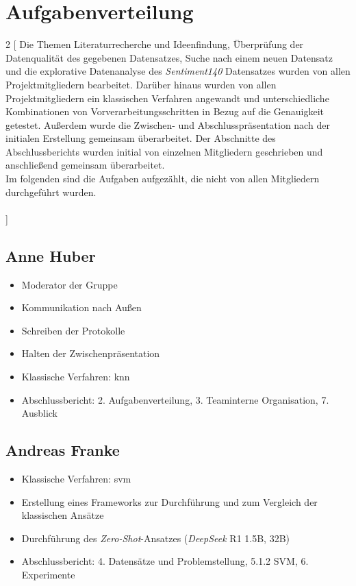 \section{Aufgabenverteilung}\label{sec:aufgabenverteilung}

\begin{multicols}{2}
[
Die Themen Literaturrecherche und Ideenfindung, Überprüfung der Datenqualität des gegebenen Datensatzes, Suche nach einem neuen Datensatz und die explorative Datenanalyse des \textit{Sentiment140} Datensatzes wurden von allen Projektmitgliedern bearbeitet.
Darüber hinaus wurden von allen Projektmitgliedern ein klassischen Verfahren angewandt und unterschiedliche Kombinationen von Vorverarbeitungsschritten in Bezug auf die Genauigkeit getestet.
Außerdem wurde die Zwischen- und Abschlusspräsentation nach der initialen Erstellung gemeinsam überarbeitet.
Der Abschnitte des Abschlussberichts wurden initial von einzelnen Mitgliedern geschrieben und anschließend gemeinsam überarbeitet.\\
Im folgenden sind die Aufgaben aufgezählt, die nicht von allen Mitgliedern durchgeführt wurden.\\
\\
]

\subsection{Anne Huber}
\begin{itemize}
    \item Moderator der Gruppe
    \item Kommunikation nach Außen
    \item Schreiben der Protokolle
    \item Halten der Zwischenpräsentation
    \item Klassische Verfahren: \gls{knn}
    \item Abschlussbericht: 2. Aufgabenverteilung, 3. Teaminterne Organisation, 7. Ausblick
\end{itemize}


\subsection{Andreas Franke}
\begin{itemize}
    \item Klassische Verfahren: \gls{svm}
    \item Erstellung eines Frameworks zur Durchführung und zum Vergleich der klassischen Ansätze
    \item Durchführung des \textit{Zero-Shot}-Ansatzes (\textit{DeepSeek} R1 1.5B, 32B)
    \item Abschlussbericht: 4. Datensätze und Problemstellung, 5.1.2 SVM, 6. Experimente
\end{itemize}


\end{multicols}
